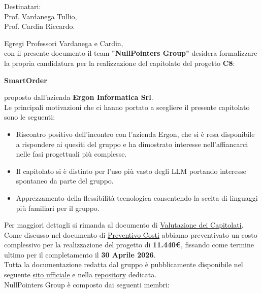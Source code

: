 \documentclass{article}
\begin{document}
	\begin{center}
		\begin {minipage}{1.0\textwidth}
			Destinatari:\\
			Prof. Vardanega Tullio,\\
			Prof. Cardin Riccardo.\\
		\end{minipage}
	\end{center}
	Egregi Professori Vardanega e Cardin,\\
	con il presente documento il team \textbf{"NullPointers Group"} desidera formalizzare la propria candidatura per la realizzazione del  capitolato del progetto \textbf{C8}:\\
	\begin{center}
		\textbf{SmartOrder}
	\end{center}
	proposto dall'azienda \textbf{Ergon Informatica Srl}.\\
	Le principali motivazioni che ci hanno portato a scegliere il presente capitolato sono le seguenti:
	\begin {itemize}
		\item Riscontro positivo dell'incontro con l'azienda Ergon, che si è resa disponibile a rispondere ai quesiti del gruppo e ha dimostrato interesse nell'affiancarci nelle fasi progettuali più complesse.
		\item Il capitolato si è distinto per l'uso più vasto degli LLM portando interesse spontaneo da parte del gruppo.
		\item Apprezzamento della flessibilità tecnologica consentendo la scelta di linguaggi più familiari per il gruppo.
	\end {itemize} 
	Per maggiori dettagli si rimanda al documento di \underline{\href{https://nullpointersgroup.github.io/Documentazione/output/Candidatura/Valutazione_capitolati.pdf}{Valutazione dei Capitolati}}.\\

	Come discusso nel documento di \underline{\href{https://nullpointersgroup.github.io/Documentazione/output/Candidatura/Preventivo_Costi.pdf}{Preventivo Costi}} abbiamo preventivato un costo complessivo per la realizzazione del progetto di \textbf{11.440€}, fissando come termine ultimo per il completamento il \textbf{30 Aprile 2026}.\\
	
	Tutta la documentazione redatta dal gruppo è pubblicamente disponibile nel seguente \underline{\href{https://nullpointersgroup.github.io/Documentazione}{sito ufficiale}} e nella \underline{\href{https://github.com/NullPointersGroup/Documentazione}{repository}} dedicata.\\
	NullPointers Group è composto dai seguenti membri:\newline
	
\end{document}
